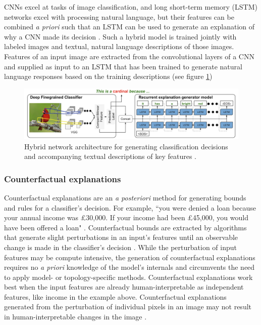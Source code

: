 CNNs excel at tasks of image classification, and long short-term memory (LSTM) networks excel with processing natural language, but their features can be combined \textit{a priori} such that an LSTM can be used to generate an explanation of why a CNN made its decision \cite{10.1007/978-3-319-46493-0_1}.  Such a hybrid model is trained jointly with labeled images and textual, natural language descriptions of those images.  Features of an input image are extracted from the convolutional layers of a CNN and supplied as input to an LSTM that has been trained to generate natural language responses based on the training descriptions (see figure \ref{fig:hendricks2016})

\begin{figure}
    \includegraphics[width=\textwidth]{media/hendricks2016.png}
    \caption{Hybrid network architecture for generating classification decisions and accompanying textual descriptions of key features \cite{10.1007/978-3-319-46493-0_1}.}
    \label{fig:hendricks2016}
\end{figure}

\subsubsection{Counterfactual explanations}

Counterfactual explanations are an \textit{a posteriori} method for generating bounds and rules for a classifier's decision.  For example, “you were denied a loan because your annual income was £30,000. If your income had been £45,000, you would have been offered a loan" \cite{DBLP:journals/corr/abs-1711-00399}.  Counterfactual bounds are extracted by algorithms that generate slight perturbations in an input's features until an observable change is made in the classifier's decision \cite{DBLP:journals/corr/abs-1711-00399}.  While the perturbation of input features may be compute intensive, the generation of counterfactual explanations requires no \textit{a priori} knowledge of the model's internals and circumvents the need to apply model- or topology-specific methods.  Counterfactual explanations work best when the input features are already human-interpretable as independent features, like income in the example above.  Counterfactual explanations generated from the perturbation of individual pixels in an image may not result in human-interpretable changes in the image \cite{DBLP:journals/corr/abs-1711-00399}.

